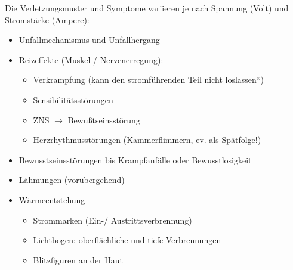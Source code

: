{ Die Verletzungsmuster und Symptome variieren je nach Spannung (Volt) und
Stromstärke (Ampere):

\begin{itemize}
  \item Unfallmechanismus und Unfallhergang
  \item Reizeffekte (Muskel-/ Nervenerregung):
  \begin{itemize}
    \item Verkrampfung ({\quotedblbase}kann den stromführenden Teil nicht
    loslassen{\textquotedblleft})
    \item Sensibilitätsstörungen
    \item ZNS ${\rightarrow}$ Bewußtseinsstörung
    \item Herzrhythmusstörungen (Kammerflimmern, ev.  als Spätfolge!)
  \end{itemize}
  \item Bewusstseinsstörungen bis Krampfanfälle oder Bewusstlosigkeit
  \item Lähmungen (vorübergehend)
  \item Wärmeentstehung
  \begin{itemize}
    \item Strommarken (Ein-/ Austrittsverbrennung)
    \item Lichtbogen: oberflächliche und tiefe  Verbrennungen
    \item Blitzfiguren an der Haut
  \end{itemize}
\end{itemize}


}

